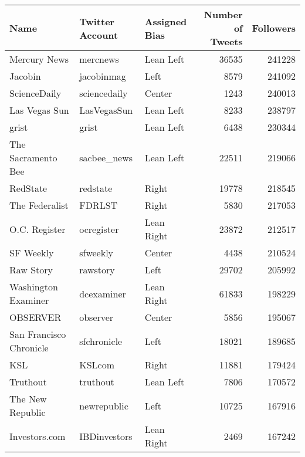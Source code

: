 \begin{tabular}{lllrr}
\toprule
                    Name &  Twitter Account & Assigned Bias &  Number of Tweets &  Followers \\
\midrule
            Mercury News &         mercnews &     Lean Left &             36535 &     241228 \\
                 Jacobin &       jacobinmag &          Left &              8579 &     241092 \\
            ScienceDaily &     sciencedaily &        Center &              1243 &     240013 \\
           Las Vegas Sun &      LasVegasSun &     Lean Left &              8233 &     238797 \\
                   grist &            grist &     Lean Left &              6438 &     230344 \\
      The Sacramento Bee &      sacbee\_news &     Lean Left &             22511 &     219066 \\
                RedState &         redstate &         Right &             19778 &     218545 \\
          The Federalist &           FDRLST &         Right &              5830 &     217053 \\
           O.C. Register &       ocregister &    Lean Right &             23872 &     212517 \\
               SF Weekly &         sfweekly &        Center &              4438 &     210524 \\
               Raw Story &         rawstory &          Left &             29702 &     205992 \\
     Washington Examiner &       dcexaminer &    Lean Right &             61833 &     198229 \\
                OBSERVER &         observer &        Center &              5856 &     195067 \\
 San Francisco Chronicle &      sfchronicle &          Left &             18021 &     189685 \\
                     KSL &           KSLcom &         Right &             11881 &     179424 \\
                Truthout &         truthout &     Lean Left &              7806 &     170572 \\
        The New Republic &      newrepublic &          Left &             10725 &     167916 \\
           Investors.com &     IBDinvestors &    Lean Right &              2469 &     167242 \\

\end{tabular}
